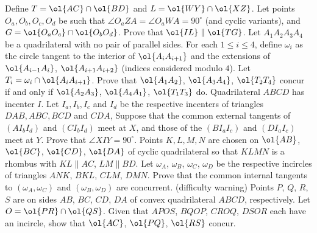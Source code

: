 \documentclass{seto}
\begin{document}
 Define $T=\ol{AC}\cap\ol{BD}$ and $L=\ol{WY}\cap\ol{XZ}$. 
 Let points $O_a,O_b,O_c,O_d$ be such that 
 $\angle O_aZA=\angle O_aWA=90^\circ$ (and cyclic variants), 
 and $G=\ol{O_aO_c}\cap\ol{O_bO_d}$. Prove that $\ol{IL}\parallel\ol{TG}$.
\exercise[RMM 2010/3] Let $A_1A_2A_3A_4$ be a quadrilateral with no pair of parallel sides. 
For each $1\le i\le 4$, define $\omega_i$ as the circle tangent to the interior of $\ol{A_iA_{i+1}}$
and the extensions of $\ol{A_{i-1}A_i}$, $\ol{A_{i+1}A_{i+2}}$ (indices considered modulo $4$). 
Let $T_i=\omega_i\cap\ol{A_iA_{i+1}}$.
Prove that $\ol{A_1A_2}$, $\ol{A_3A_4}$, $\ol{T_2T_4}$ concur if and only if 
$\ol{A_2A_3}$, $\ol{A_4A_1}$, $\ol{T_1T_3}$ do.
\exercise[ISL 2017/G7] Quadrilateral $ABCD$ has incenter $I$. 
 Let $I_a, I_b, I_c$ and $I_d$ be the respective incenters of triangles $DAB, ABC, BCD$ and $CDA$, 
 Suppose that the common external tangents of $(AI_bI_d)$ and $(CI_bI_d)$ meet at $X$, 
 and those of the $(BI_aI_c)$ and $(DI_aI_c)$ meet at $Y$. 
 Prove that $\angle{XIY}=90^{\circ}$.
\exercise[ISL 2020/G5] Points $K, L, M, N$ are chosen on 
$\ol{AB}$, $\ol{BC}$, $\ol{CD}$, $\ol{DA}$ of cyclic quadrilateral so that
 $KLMN$ is a rhombus with $KL \parallel AC$, $LM \parallel BD$. 
 Let $\omega_A$, $\omega_B$, $\omega_C$, $\omega_D$ be the respective incircles of 
 triangles $ANK$, $BKL$, $CLM$, $DMN$. 
 Prove that the common internal tangents to $(\omega_A, \omega_C)$ and  
 $(\omega_B,\omega_D)$ are concurrent.
\exercise[ISL 2015/G7] (difficulty warning)
Points $P$, $Q$, $R$, $S$ are on sides $AB$, $BC$, $CD$, $DA$
of convex quadrilateral $ABCD$, respectively. Let $O=\ol{PR}\cap\ol{QS}$. 
Given that $APOS$, $BQOP$, $CROQ$, $DSOR$ each have an incircle,
show that $\ol{AC}$, $\ol{PQ}$, $\ol{RS}$ concur. 
\end{document}
